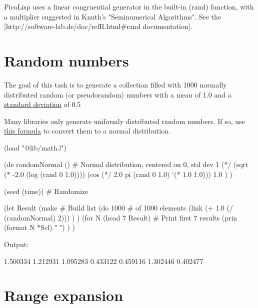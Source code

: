 \begin{wideverbatim}

PicoLisp uses a linear congruential generator in the built-in (rand) function,
with a multiplier suggested in Knuth's "Seminumerical Algorithms". See the
[http://software-lab.de/doc/refR.html#rand documentation].

\end{wideverbatim}

\pagebreak{}
\section*{Random numbers}

The goal of this task is to generate a collection filled with 1000
normally distributed random (or pseudorandom) numbers with a mean of 1.0
and a \href{http://en.wikipedia.org/wiki/Standard\_deviation}{standard
deviation} of 0.5

Many libraries only generate uniformly distributed random numbers. If
so, use
\href{http://en.wikipedia.org/wiki/Normal\_distribution\#Generating\_values\_from\_normal\_distribution}{this
formula} to convert them to a normal distribution.

\begin{wideverbatim}



(load "@lib/math.l")

(de randomNormal ()  # Normal distribution, centered on 0, std dev 1
   (*/
      (sqrt (* -2.0 (log (rand 0 1.0))))
      (cos (*/ 2.0 pi (rand 0 1.0) `(* 1.0 1.0)))
      1.0 ) )

(seed (time))                                      # Randomize

(let Result
   (make                                           # Build list
      (do 1000                                     # of 1000 elements
         (link (+ 1.0 (/ (randomNormal) 2))) ) )
   (for N (head 7 Result)                          # Print first 7 results
      (prin (format N *Scl) " ") ) )

Output:

1.500334 1.212931 1.095283 0.433122 0.459116 1.302446 0.402477

\end{wideverbatim}

\pagebreak{}
\section*{Range expansion}

